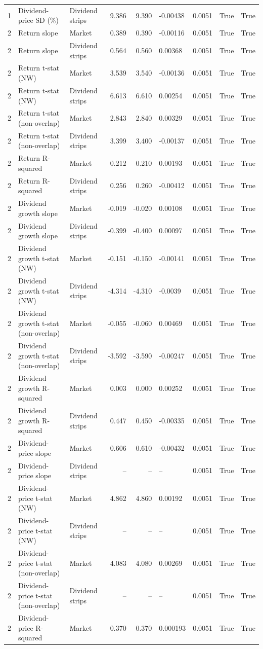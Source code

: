 \documentclass[10pt]{article}
\begin{document}
\begin{landscape}
\begin{longtable}{rllrrllrr}
1 & Dividend-price SD (\%) & Dividend strips & 9.386 & 9.390 & -0.00438 & 0.0051 & True & True \\
2 & Return slope & Market & 0.389 & 0.390 & -0.00116 & 0.0051 & True & True \\
2 & Return slope & Dividend strips & 0.564 & 0.560 & 0.00368 & 0.0051 & True & True \\
2 & Return t-stat (NW) & Market & 3.539 & 3.540 & -0.00136 & 0.0051 & True & True \\
2 & Return t-stat (NW) & Dividend strips & 6.613 & 6.610 & 0.00254 & 0.0051 & True & True \\
2 & Return t-stat (non-overlap) & Market & 2.843 & 2.840 & 0.00329 & 0.0051 & True & True \\
2 & Return t-stat (non-overlap) & Dividend strips & 3.399 & 3.400 & -0.00137 & 0.0051 & True & True \\
2 & Return R-squared & Market & 0.212 & 0.210 & 0.00193 & 0.0051 & True & True \\
2 & Return R-squared & Dividend strips & 0.256 & 0.260 & -0.00412 & 0.0051 & True & True \\
2 & Dividend growth slope & Market & -0.019 & -0.020 & 0.00108 & 0.0051 & True & True \\
2 & Dividend growth slope & Dividend strips & -0.399 & -0.400 & 0.00097 & 0.0051 & True & True \\
2 & Dividend growth t-stat (NW) & Market & -0.151 & -0.150 & -0.00141 & 0.0051 & True & True \\
2 & Dividend growth t-stat (NW) & Dividend strips & -4.314 & -4.310 & -0.0039 & 0.0051 & True & True \\
2 & Dividend growth t-stat (non-overlap) & Market & -0.055 & -0.060 & 0.00469 & 0.0051 & True & True \\
2 & Dividend growth t-stat (non-overlap) & Dividend strips & -3.592 & -3.590 & -0.00247 & 0.0051 & True & True \\
2 & Dividend growth R-squared & Market & 0.003 & 0.000 & 0.00252 & 0.0051 & True & True \\
2 & Dividend growth R-squared & Dividend strips & 0.447 & 0.450 & -0.00335 & 0.0051 & True & True \\
2 & Dividend-price slope & Market & 0.606 & 0.610 & -0.00432 & 0.0051 & True & True \\
2 & Dividend-price slope & Dividend strips & -- & -- & -- & 0.0051 & True & True \\
2 & Dividend-price t-stat (NW) & Market & 4.862 & 4.860 & 0.00192 & 0.0051 & True & True \\
2 & Dividend-price t-stat (NW) & Dividend strips & -- & -- & -- & 0.0051 & True & True \\
2 & Dividend-price t-stat (non-overlap) & Market & 4.083 & 4.080 & 0.00269 & 0.0051 & True & True \\
2 & Dividend-price t-stat (non-overlap) & Dividend strips & -- & -- & -- & 0.0051 & True & True \\
2 & Dividend-price R-squared & Market & 0.370 & 0.370 & 0.000193 & 0.0051 & True & True \\
\end{longtable}



\end{landscape}
\end{document}
